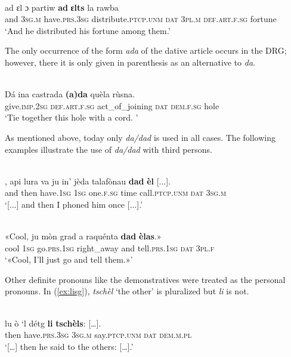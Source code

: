  \ea\label{}
\\
\gll ad ɛl ɔ partiw \textbf{ad} \textbf{ɛlts} la rawba\\
     and \textsc{3sg.m} have.\textsc{prs.3sg} distribute.\textsc{ptcp.unm} \textsc{dat} \textsc{3pl.m} \textsc{def.art.f.sg} fortune\\
\glt `And he distributed his fortune among them.'
\z

The only occurrence of the form \textit{ada} of the dative article occurs in the DRG; however, there it is only given in parenthesis as an alternative to \textit{da}.

\ea\label{}
\\
\gll  Dá ina castrada \textbf{(a)da} quèla rùsna.\\
     give.\textsc{imp.2sg} \textsc{def.art.f.sg} act\_of\_joining \textsc{dat} \textsc{dem.f.sg} hole\\
\glt `Tie together this hole with a cord. '
\z

As mentioned above, today only \textit{da/dad} is used in all cases. The following examples illustrate the use of \textit{da/dad} with third persons.

\ea
\label{}
\\ 
\gll  [...], api lura va ju in’ jèda talafònau \textbf{dad} \textbf{èl} [...].\\
{} and then have.\textsc{1sg}  \textsc{1sg} one.\textsc{f.sg} time call.\textsc{ptcp.unm} \textsc{dat} \textsc{3sg.m}\\
\glt `[...] and then I phoned him once [...].'
\z

\ea
\label{}
\\
\gll  «Cool, ju mòn grad a raquénta \textbf{dad} \textbf{èlas}.»\\
cool \textsc{1sg}  go.\textsc{prs.1sg} right\_away and tell.\textsc{prs.1sg} \textsc{dat} \textsc{3pl.f} \\
\glt `«Cool, I’ll just go and tell them.»'
\z

Other definite pronouns like the demonstratives were treated as the personal pronouns. In (\ref{ex:lisg}), \textit{tschèl} `the other' is pluralized but \textit{li} is not.

\ea\label{ex:lisg}
\\
\gll  […] lu ò ‘l détg \textbf{li} \textbf{tschèls}: […].\\
{} then have.\textsc{prs.3sg} \textsc{3sg.m} say.\textsc{ptcp.unm} \textsc{dat} \textsc{dem.m.pl}\\
\glt `[…] then he said to the others: […].'
\z


